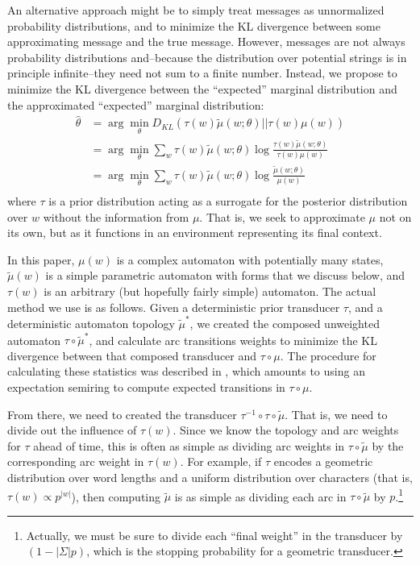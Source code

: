 \documentclass[11pt,a4paper]{article}
\begin{document}
An alternative approach might be to simply treat messages as
unnormalized probability distributions, and to minimize the KL
divergence between some approximating message and the true message.
However, messages are not always probability distributions and--because
the distribution over potential strings is in principle infinite--they
need not sum to a finite number. Instead, we propose to minimize
the KL divergence between the ``expected'' marginal distribution
and the approximated ``expected'' marginal distribution:
\begin{equation}
  \begin{split}
    \hat\theta &= \arg\!\min_{\theta} D_{KL}(\tau(w)\tilde\mu(w;\theta)||\tau(w)\mu(w) ) \\
    &= \arg\!\min_{\theta} \sum_w \tau(w) \tilde\mu(w;\theta) \log \frac{\tau(w)\tilde\mu(w;\theta)}{\tau(w)\mu(w)} \\
    &= \arg\!\min_{\theta} \sum_w \tau(w) \tilde\mu(w;\theta) \log \frac{\tilde\mu(w;\theta)}{\mu(w)} \\
   \end{split}
 \end{equation}
where $\tau$ is a prior distribution acting as a surrogate for the
posterior distribution over $w$ without the information from $\mu$.
That is, we seek to approximate $\mu$ not on its own, but as it
functions in an environment representing its final context.

In this paper, $\mu(w)$ is a complex automaton with potentially
many states, $\tilde\mu(w)$ is a simple parametric automaton with
forms that we discuss below, and $\tau(w)$ is an arbitrary (but
hopefully fairly simple) automaton. The actual method we use is as
follows. Given a deterministic prior transducer $\tau$, and a
deterministic automaton topology $\tilde\mu^*$, we created the
composed unweighted automaton $\tau \circ \tilde\mu^*$, and calculate
arc transitions weights to minimize the KL divergence between that
composed transducer and $\tau\circ\mu$. The procedure for calculating
these statistics was described in , which
amounts to using an expectation semiring \cite{eisner2001expectation}
to compute expected transitions in $\tau\circ\mu$.

From there, we need to created the transducer $\tau^{-1}
\circ\tau\circ\tilde\mu$. That is, we need to divide out the influence
of $\tau(w)$. Since we know the topology and arc weights for $\tau$
ahead of time, this is often as simple as dividing arc weights in
$\tau\circ\tilde\mu$ by the corresponding arc weight in $\tau(w)$.
For example, if $\tau$ encodes a geometric distribution over word
lengths and a uniform distribution over characters (that is, $\tau(w)
\propto {p^{|w|}}$), then computing $\tilde\mu$ is as simple as
dividing each arc in $\tau\circ\tilde\mu$ by $p$.\footnote{Actually,
we must be sure to divide each ``final weight'' in the transducer
by $(1-|\Sigma| p)$, which is the stopping probability for a geometric
transducer.}
\end{document}
